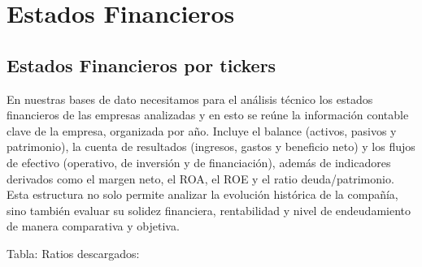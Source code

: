 \documentclass[letterpaper,10pt,spanish]{sphinxmanual}
\begin{document}
\begin{sphinxVerbatim}[commandchars=\\\{\},numbers=left,firstnumber=1,stepnumber=1]
       
\end{sphinxVerbatim}


\section{Estados Financieros}
\label{\detokenize{DatosPreparacion:estados-financieros}}

\subsection{Estados Financieros por tickers}
\label{\detokenize{DatosPreparacion:estados-financieros-por-tickers}}
\sphinxAtStartPar
En nuestras bases de dato necesitamos para el análisis técnico los estados financieros de las empresas analizadas y en esto se reúne la información contable clave de la empresa, organizada por año. Incluye el balance (activos, pasivos y patrimonio), la cuenta de resultados (ingresos, gastos y beneficio neto) y los flujos de efectivo (operativo, de inversión y de financiación), además de indicadores derivados como el margen neto, el ROA, el ROE y el ratio deuda/patrimonio. Esta estructura no solo permite analizar la evolución histórica de la compañía, sino también evaluar su solidez financiera, rentabilidad y nivel de endeudamiento de manera comparativa y objetiva.

\sphinxAtStartPar
Tabla: Ratios descargados:
\end{document}
